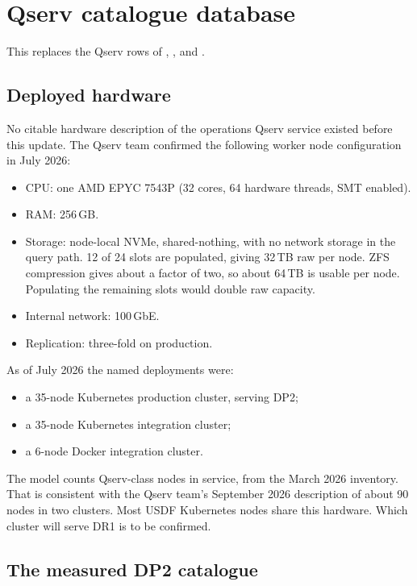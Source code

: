 \section{Qserv catalogue database}\label{sec:upqserv}

This replaces the Qserv rows of ,
,  and
.

\subsection{Deployed hardware}

No citable hardware description of the operations Qserv service existed
before this update. The Qserv team confirmed the following worker node
configuration in July 2026:

\begin{itemize}
\item CPU: one AMD EPYC 7543P (32 cores, 64 hardware threads, SMT enabled).
\item RAM: 256\,GB.
\item Storage: node-local NVMe, shared-nothing, with no network storage in
      the query path. 12 of 24 slots are populated, giving 32\,TB raw per
      node. ZFS compression gives about a factor of two, so about 64\,TB is
      usable per node. Populating the remaining slots would double raw
      capacity.
\item Internal network: 100\,GbE.
\item Replication: three-fold on production.
\end{itemize}

As of July 2026 the named deployments were:
\begin{itemize}
\item a 35-node Kubernetes production cluster, serving DP2;
\item a 35-node Kubernetes integration cluster;
\item a 6-node Docker integration cluster.
\end{itemize}
The model counts \smQsNodesHave{} Qserv-class nodes in service, from the March
2026 inventory. That is consistent with the Qserv team's September 2026
description of about 90 nodes in two clusters. Most USDF Kubernetes nodes share
this hardware. Which cluster will serve DR1 is to be confirmed.

\subsection{The measured DP2 catalogue}

